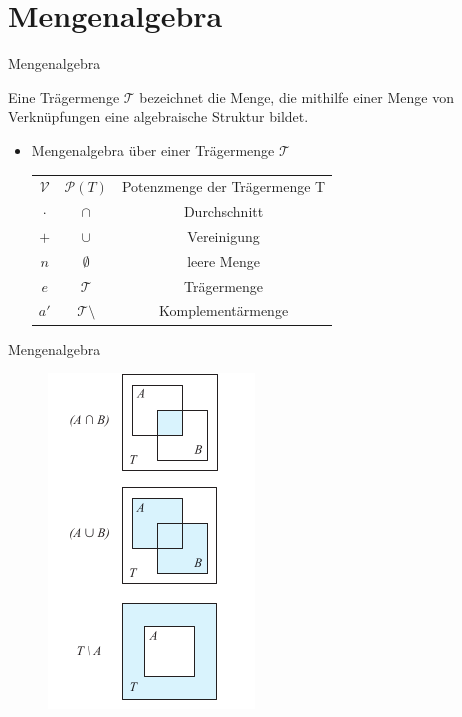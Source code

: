 \documentclass[12pt%
,aspectratio=169%
]{beamer}
\begin{document}
\section{Mengenalgebra}
\begin{frame}{Mengenalgebra}
	\begin{definition}[Trägermenge]
	 Eine Trägermenge $\mathcal{T}$ bezeichnet die Menge, die mithilfe einer Menge von Verknüpfungen eine algebraische Struktur bildet.
	\end{definition}
\begin{itemize}
	\item Mengenalgebra über einer Trägermenge $\mathcal{T}$ 
\begin{center}
	\begin{table}[]
	\begin{tabular}{ccc}
$\mathcal{V}$ & $\mathcal{P}(T)$ & Potenzmenge der Trägermenge T \\
	$\cdot$ & $\cap$ & Durchschnitt \\
	$+$ & $\cup$ & Vereinigung\\
	$n$ & $\emptyset$ & leere Menge\\
	$e$ & $\mathcal{T}$ &  Trägermenge\\
	$a'$ & $\mathcal{T} \setminus$ & Komplementärmenge\\
\end{tabular}
\end{table}
\end{center}
\end{itemize}
\end{frame}

\begin{frame}{Mengenalgebra}
\begin{figure}
	\center
	\includegraphics[scale=0.4]{pictures/menge1}
\end{figure}
\end{frame}
\end{document}

